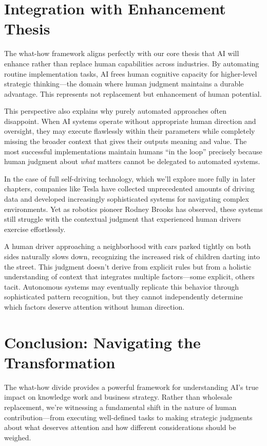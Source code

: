 \documentclass[
  Letterpaper,
]{scrbook}
\begin{document}
\section{Integration with Enhancement
Thesis}\label{integration-with-enhancement-thesis-1}

The what-how framework aligns perfectly with our core thesis that AI
will enhance rather than replace human capabilities across industries.
By automating routine implementation tasks, AI frees human cognitive
capacity for higher-level strategic thinking---the domain where human
judgment maintains a durable advantage. This represents not replacement
but enhancement of human potential.

This perspective also explains why purely automated approaches often
disappoint. When AI systems operate without appropriate human direction
and oversight, they may execute flawlessly within their parameters while
completely missing the broader context that gives their outputs meaning
and value. The most successful implementations maintain humans ``in the
loop'' precisely because human judgment about \emph{what} matters cannot
be delegated to automated systems.

In the case of full self-driving technology, which we'll explore more
fully in later chapters, companies like Tesla have collected
unprecedented amounts of driving data and developed increasingly
sophisticated systems for navigating complex environments. Yet as
robotics pioneer Rodney Brooks has observed, these systems still
struggle with the contextual judgment that experienced human drivers
exercise effortlessly.

A human driver approaching a neighborhood with cars parked tightly on
both sides naturally slows down, recognizing the increased risk of
children darting into the street. This judgment doesn't derive from
explicit rules but from a holistic understanding of context that
integrates multiple factors---some explicit, others tacit. Autonomous
systems may eventually replicate this behavior through sophisticated
pattern recognition, but they cannot independently determine which
factors deserve attention without human direction.

\section{Conclusion: Navigating the
Transformation}\label{conclusion-navigating-the-transformation-1}

The what-how divide provides a powerful framework for understanding AI's
true impact on knowledge work and business strategy. Rather than
wholesale replacement, we're witnessing a fundamental shift in the
nature of human contribution---from executing well-defined tasks to
making strategic judgments about what deserves attention and how
different considerations should be weighed.
\end{document}
